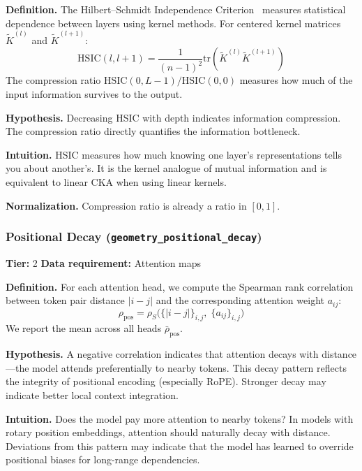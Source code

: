 \documentclass[preprint]{neurips_2025}
\begin{document}
\textbf{Definition.}
The Hilbert--Schmidt Independence Criterion~\citep{gretton2005measuring} measures statistical dependence between layers using kernel methods. For centered kernel matrices $\tilde{K}^{(l)}$ and $\tilde{K}^{(l+1)}$:
\begin{equation}
  \text{HSIC}(l, l+1) = \frac{1}{(n-1)^2} \text{tr}(\tilde{K}^{(l)} \tilde{K}^{(l+1)})
\end{equation}
The compression ratio $\text{HSIC}(0, L-1) / \text{HSIC}(0, 0)$ measures how much of the input information survives to the output.

\textbf{Hypothesis.}
Decreasing HSIC with depth indicates information compression. The compression ratio directly quantifies the information bottleneck.

\textbf{Intuition.}
HSIC measures how much knowing one layer's representations tells you about another's. It is the kernel analogue of mutual information and is equivalent to linear CKA when using linear kernels.

\textbf{Normalization.} Compression ratio is already a ratio in $[0, 1]$.

\subsubsection{Positional Decay (\texttt{geometry\_positional\_decay})}
\label{app:positional-decay}

\textbf{Tier:} 2 \quad \textbf{Data requirement:} Attention maps

\textbf{Definition.}
For each attention head, we compute the Spearman rank correlation between token pair distance $|i - j|$ and the corresponding attention weight $a_{ij}$:
\begin{equation}
  \rho_{\text{pos}} = \rho_S\!\bigl(\{|i-j|\}_{i,j},\; \{a_{ij}\}_{i,j}\bigr)
\end{equation}
We report the mean across all heads $\bar\rho_{\text{pos}}$.

\textbf{Hypothesis.}
A negative correlation indicates that attention decays with distance---the model attends preferentially to nearby tokens. This decay pattern reflects the integrity of positional encoding (especially RoPE). Stronger decay may indicate better local context integration.

\textbf{Intuition.}
Does the model pay more attention to nearby tokens? In models with rotary position embeddings, attention should naturally decay with distance. Deviations from this pattern may indicate that the model has learned to override positional biases for long-range dependencies.
\end{document}
